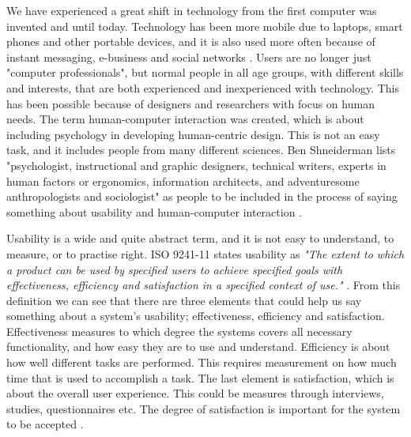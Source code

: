 We have experienced a great shift in technology from the first computer was invented and until today. Technology has been more mobile due to laptops, smart phones and other portable devices, and it is also used more often because of instant messaging, e-business and social networks \cite{mmi}. Users are no longer just "computer professionals", but normal people in all age groups, with different skills and interests, that are both experienced and inexperienced with technology. This has been possible because of designers and researchers with focus on human needs. The term human-computer interaction was created, which is about including psychology in developing human-centric design. This is not an easy task, and it includes people from  many different sciences. Ben Shneiderman lists "psychologist, instructional and graphic designers, technical writers, experts in human factors or ergonomics, information architects, and adventuresome anthropologists and sociologist" as people to be included in the process of saying something about usability and human-computer interaction \cite{mmi}.  

Usability is a wide and quite abstract term, and it is not easy to understand, to measure, or to practise right. ISO 9241-11 states usability as \emph{"The extent to which a product can be used by specified users to achieve specified goals with effectiveness, efficiency and satisfaction in a specified context of use."} \cite{usabilitydef}. From this definition we can see that there are three elements that could help us say something about a system's usability; effectiveness, efficiency and satisfaction. Effectiveness measures to which degree the systems covers all necessary functionality, and how easy they are to use and understand. Efficiency is about how well different tasks are performed. This requires measurement on how much time that is used to accomplish a task. The last element is satisfaction, which is about the overall user experience. This could be measures through interviews, studies, questionnaires etc. The degree of satisfaction is important for the system to be accepted \cite{mmi}. 

